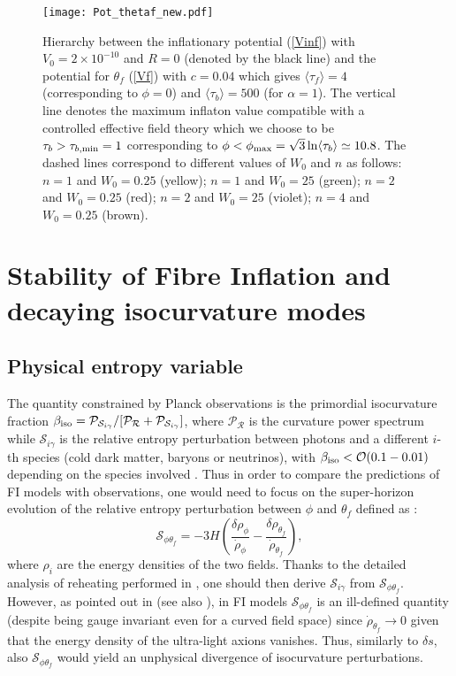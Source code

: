 \documentclass[aps,prd,a4paper,twocolumn,amsmath,showpacs,superscriptaddress,nofootinbib,preprintnumbers]{revtex4-1}
\newcommand{\be}{\begin{equation}}
\newcommand{\ee}{\end{equation}}
\newcommand{\mc}{\mathcal}
\begin{document}
\begin{figure}[!htbp]
\centering
\texttt{[image: Pot\_thetaf\_new.pdf]}
\caption{Hierarchy between the inflationary potential (\ref{Vinf}) with $V_0=2\times 10^{-10}$ and $R=0$ (denoted by the black line) and the potential for $\theta_f$ (\ref{Vf}) with $c=0.04$ which gives $\langle\tau_f\rangle=4$ (corresponding to $\phi=0$) and $\langle\tau_b\rangle=500$ (for $\alpha=1$). The vertical line denotes the maximum inflaton value compatible with a controlled effective field theory which we choose to be $\tau_b>\tau_{b,{\rm min}} = 1$ corresponding to $\phi <\phi_{\rm max} = \sqrt{3} \ln\langle\tau_b\rangle \simeq 10.8$. The dashed lines correspond to different values of $W_0$ and $n$ as follows: $n=1$ and $W_0=0.25$ (yellow); $n=1$ and $W_0=25$ (green); $n=2$ and $W_0=0.25$ (red); $n=2$ and $W_0=25$ (violet); $n=4$ and $W_0=0.25$ (brown).}
\label{Fig2}
\end{figure}





\section{Stability of Fibre Inflation and decaying isocurvature modes}
\label{NoInst}

\subsection{Physical entropy variable}

The quantity constrained by Planck observations is the primordial isocurvature fraction $\beta_{\rm iso} = \mc{P}_{\mc{S}_{i\gamma}}/ [\mc{P}_{\mc{R}} + \mc{P}_{\mc{S}_{i\gamma}}]$, where $\mc{P}_{\mc{R}}$ is the curvature power spectrum while $\mc{S}_{i\gamma}$ is the relative entropy perturbation between photons and a different $i$-th species (cold dark matter, baryons or neutrinos), with $\beta_{\rm iso}<\mc{O}(0.1-0.01)$ depending on the species involved \cite{Akrami:2018odb}. Thus in order to compare the predictions of FI models with observations, one would need to focus on the super-horizon evolution of the relative entropy perturbation between $\phi$ and $\theta_f$ defined as \cite{Malik:2004tf}:
\be 
\mc{S}_{\phi \theta_f}= -3 H \left(\frac{\delta\rho_\phi}{\dot\rho_\phi}-\frac{\delta\rho_{\theta_f}}{\dot\rho_{\theta_f}}\right),
\ee
where $\rho_i$ are the energy densities of the two fields. Thanks to the detailed analysis of reheating performed in \cite{Cicoli:2018cgu}, one should then derive $\mc{S}_{i\gamma}$ from $\mc{S}_{\phi \theta_f}$. However, as pointed out in \cite{Cicoli:2021yhb} (see also \cite{Wands:2000dp}), in FI models $\mc{S}_{\phi \theta_f}$ is an ill-defined quantity (despite being gauge invariant even for a curved field space) since $\dot\rho_{\theta_f}\to 0$ given that the energy density of the ultra-light axions vanishes. Thus, similarly to $\delta s$, also $\mc{S}_{\phi \theta_f}$ would yield an unphysical divergence of isocurvature perturbations.
\end{document}
